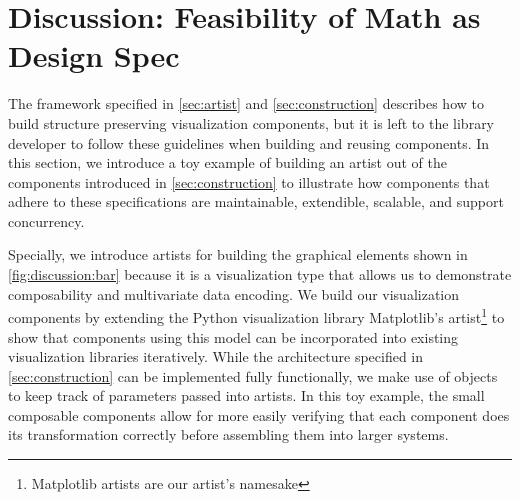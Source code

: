 \documentclass[10pt,journal,compsoc]{IEEEtran}
\theoremstyle{definition}
\theoremstyle{remark}
\begin{document}
\section{Discussion: Feasibility of Math as Design Spec}
\label{sec:discussion}
The framework specified in \autoref{sec:artist} and \autoref{sec:construction} describes how to build structure preserving visualization components, but it is left to the library developer to follow these guidelines when building and reusing components. In this section, we introduce a toy example of building an artist out of the components introduced in \autoref{sec:construction} to illustrate how components that adhere to these specifications are maintainable, extendible, scalable, and support concurrency. 

\begin{figure}[h!]
  \centering
  \label{fig:discussion:bar}
\end{figure}

Specially, we introduce artists for building the graphical elements shown in \autoref{fig:discussion:bar} because it is a visualization type that allows us to demonstrate composability and multivariate data encoding. We build our visualization components by extending the Python visualization library Matplotlib's artist\footnote{Matplotlib artists are our artist's namesake}\cite{hunterMatplotlib2DGraphics2007,hunterArchitectureOpenSource} to show that components using this model can be incorporated into existing visualization libraries iteratively. While the architecture specified in \autoref{sec:construction} can be implemented fully functionally, we make use of objects to keep track of parameters passed into artists. In this toy example, the small composable components allow for more easily verifying that each component does its transformation correctly before assembling them into larger systems.  
\end{document}
